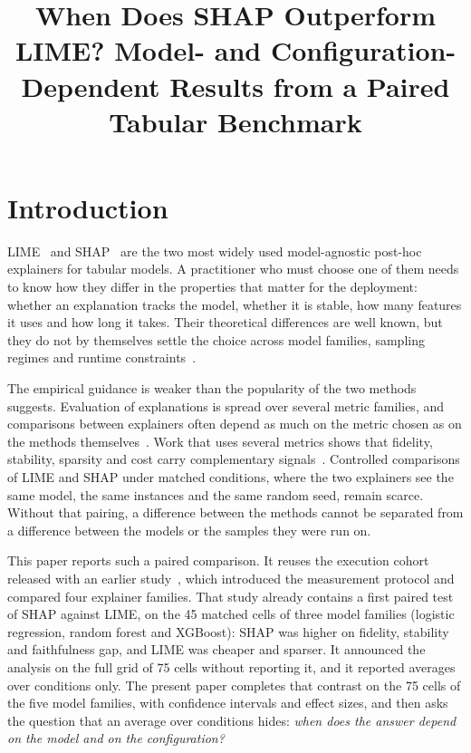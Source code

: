 \documentclass[11pt,a4paper]{article}
\title{When Does SHAP Outperform LIME? Model- and Configuration-Dependent
Results from a Paired Tabular Benchmark}
\author{}
\date{}
\begin{document}
\maketitle

\begin{abstract}
\noindent

\end{abstract}


\section{Introduction}
\label{sec:intro}

LIME~\cite{ribeiro2016why} and SHAP~\cite{lundberg2017unified} are the two
most widely used model-agnostic post-hoc explainers for tabular models. A
practitioner who must choose one of them needs to know how they differ in
the properties that matter for the deployment: whether an explanation tracks
the model, whether it is stable, how many features it uses and how long it
takes. Their theoretical differences are well known, but they do not by
themselves settle the choice across model families, sampling regimes and
runtime constraints~\cite{retzlaff2024posthoc,ali2023trustworthy}.

The empirical guidance is weaker than the popularity of the two methods
suggests. Evaluation of explanations is spread over several metric
families, and comparisons between explainers often depend as much on the
metric chosen as on the methods
themselves~\cite{nauta2023anecdotal,canha2025benchmark,longo2024manifesto}.
Work that uses several metrics shows that fidelity, stability, sparsity and
cost carry complementary
signals~\cite{pawlicki2024metrics,zheng2025ffidelity}. Controlled
comparisons of LIME and SHAP under matched conditions, where the two
explainers see the same model, the same instances and the same random seed,
remain scarce. Without that pairing, a difference between the methods cannot
be separated from a difference between the models or the samples they were
run on.

This paper reports such a paired comparison. It reuses the execution cohort
released with an earlier study~\cite{herrera2026framework}, which introduced
the measurement protocol and compared four explainer families. That study
already contains a first paired test of SHAP against LIME, on the 45 matched
cells of three model families (logistic regression, random forest and
XGBoost): SHAP was higher on fidelity, stability and faithfulness gap, and
LIME was cheaper and sparser. It announced the analysis on the full grid of
75 cells without reporting it, and it reported averages over conditions
only. The present paper completes that contrast on the 75 cells of the five
model families, with confidence intervals and effect sizes, and then asks
the question that an average over conditions hides: \emph{when does the
answer depend on the model and on the configuration?}
\end{document}
